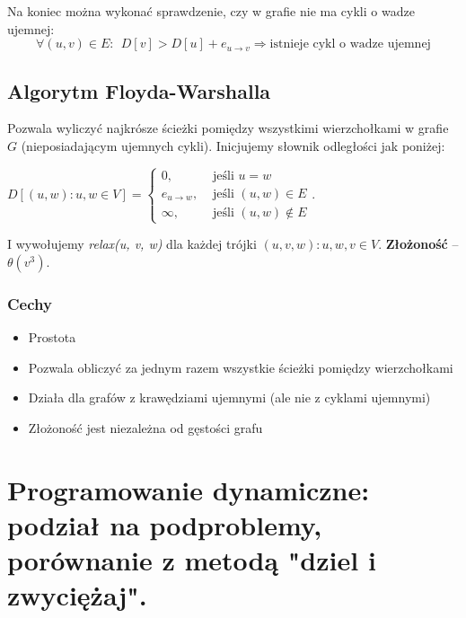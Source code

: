 \documentclass[main.tex]{subfiles}
\begin{document}
    Na koniec można wykonać sprawdzenie, czy w grafie nie ma cykli o wadze ujemnej:
    \[ \forall (u,v) \in E: ~~ D[v] > D[u] + e_{u \rightarrow v} \Rightarrow \text{istnieje cykl o wadze ujemnej}\]


    \subsection{Algorytm Floyda-Warshalla}

    Pozwala wyliczyć najkrósze ścieżki pomiędzy wszystkimi wierzchołkami w grafie $G$ (nieposiadającym ujemnych cykli).
    Inicjujemy słownik odległości jak poniżej:

    $D[(u, w) : u, w \in V] =
    \begin{cases}
        0, &\text{ jeśli } u = w\\
        e_{u \rightarrow w}, &\text{ jeśli } (u, w) \in E\\
        \infty, &\text{ jeśli } (u, w) \notin E
    \end{cases}$.

    \noindent I wywołujemy \textit{relax(u, v, w)} dla każdej trójki $(u, v, w) : u, w, v \in V$.
    \textbf{Złożoność} -- $\theta(v^3)$.

    \subsubsection{Cechy}
    \begin{itemize}[noitemsep]
        \item Prostota
        \item Pozwala obliczyć za jednym razem wszystkie ścieżki pomiędzy wierzchołkami
        \item Działa dla grafów z krawędziami ujemnymi (ale nie z cyklami ujemnymi)
        \item Złożoność jest niezależna od gęstości grafu
    \end{itemize}

    \newpage


    \section{Programowanie dynamiczne: podział na podproblemy, porównanie z metodą "dziel i zwyciężaj".}
\end{document}
